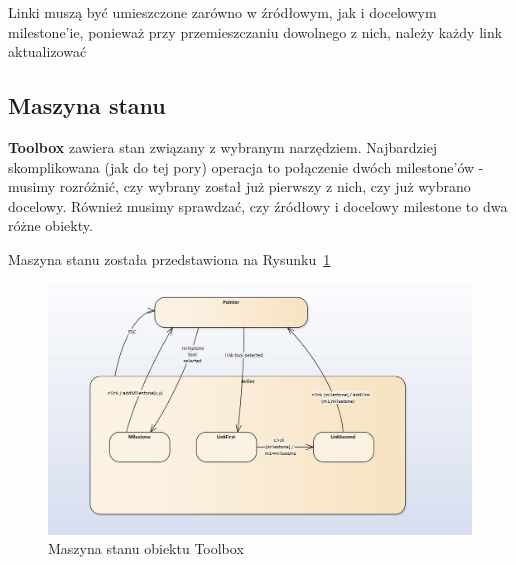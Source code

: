 Linki muszą być umieszczone zarówno w źródłowym, jak i docelowym milestone'ie, ponieważ przy przemieszczaniu dowolnego z nich, należy każdy link aktualizować

\subsection{Maszyna stanu}
\textbf{Toolbox} zawiera stan związany z wybranym narzędziem. Najbardziej skomplikowana (jak do tej pory) operacja to połączenie dwóch milestone'ów - musimy rozróżnić, czy wybrany został już pierwszy z nich, czy już wybrano docelowy. Również musimy sprawdzać, czy źródłowy i docelowy milestone to dwa różne obiekty.

Maszyna stanu została przedstawiona na Rysunku~\ref{fig:fsm-toolbox}

\begin{figure}
	\centering
	\includegraphics[width=1\linewidth]{img/fsm-toolbox}
	\caption[Maszyna stanu obiektu Toolbox]{Maszyna stanu obiektu Toolbox}
	\label{fig:fsm-toolbox}
\end{figure}